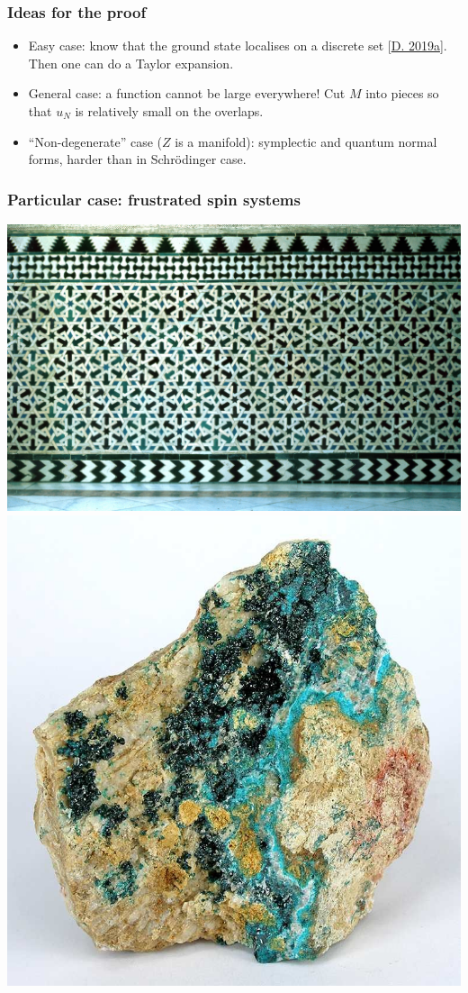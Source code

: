 \documentclass[mathserif]{beamer}
\newcommand{\mycite}[1]{{\color{mygreen} \small #1}}
\begin{document}
\begin{frame}
  \frametitle{Ideas for the proof}
  \begin{itemize}
  \item Easy case: know that the ground state localises on a discrete
    set \mycite{[\underline{D. 2019a}]}. Then one can do a Taylor
    expansion.
  \item General case: a function cannot be large everywhere! Cut $M$
    into pieces so that $u_N$ is relatively small on the overlaps.
  \item ``Non-degenerate'' case ($Z$ is a manifold): symplectic and
    quantum normal forms, harder than in Schrödinger case.
  \end{itemize}
\end{frame}

\begin{frame}
  \frametitle{Particular case: frustrated spin systems}
  \begin{center}
    \includegraphics[scale=6]{Alcazar.png}\includegraphics[scale=0.16]{Herbertsmithite.jpg}

\end{center}
\end{frame}
\end{document}
